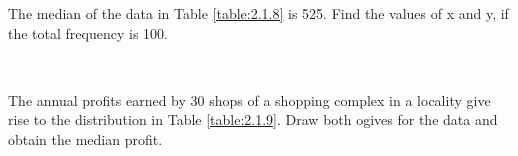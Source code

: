 \begin{table}[!hb]
\centering

\caption{}
\label{table:2.1.7}
\end{table}
\solution

\item The median of the  data in Table \ref{table:2.1.8}
is 525. Find the values of x and y, if the
total frequency is 100.
\begin{table}[!ht]
\centering
	
\caption{}
\label{table:2.1.8}
\end{table}
\\
\solution

\item The annual profits earned by 30 shops of a shopping complex in a locality give rise to  the  distribution in Table \ref{table:2.1.9}.  Draw both ogives for the data and obtain the median profit.

\begin{table}[!ht]
\centering

\caption{}
\label{table:2.1.9}
\end{table}
\solution

        
